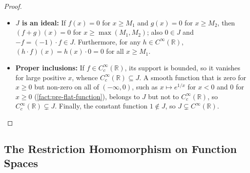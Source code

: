 \begin{content}
\begin{proof}
\begin{itemize}
    \item \textbf{$J$ is an ideal:} If $f(x) = 0$ for $x \ge M_1$ and $g(x) = 0$ for $x \ge M_2$, then $(f+g)(x) = 0$ for $x \ge \max(M_1, M_2)$; also $0 \in J$ and $-f = (-1) \cdot f \in J$. Furthermore, for any $h \in C^\infty(\mathbb{R})$, $(h \cdot f)(x) = h(x) \cdot 0 = 0$ for all $x \ge M_1$.
    \item \textbf{Proper inclusions:} If $f \in C_c^\infty(\mathbb{R})$, its support is bounded, so it vanishes for large positive $x$, whence $C_c^\infty(\mathbb{R}) \subseteq J$. A smooth function that is zero for $x \ge 0$ but non-zero on all of $(-\infty, 0)$, such as $x \mapsto e^{1/x}$ for $x < 0$ and $0$ for $x \ge 0$ (\cref{fact:pre-flat-function}), belongs to $J$ but not to $C_c^\infty(\mathbb{R})$, so $C_c^\infty(\mathbb{R}) \subsetneq J$. Finally, the constant function $1 \notin J$, so $J \subsetneq C^\infty(\mathbb{R})$.
\end{itemize}
\end{proof}
\end{content}

\subsection{The Restriction Homomorphism on Function Spaces}

